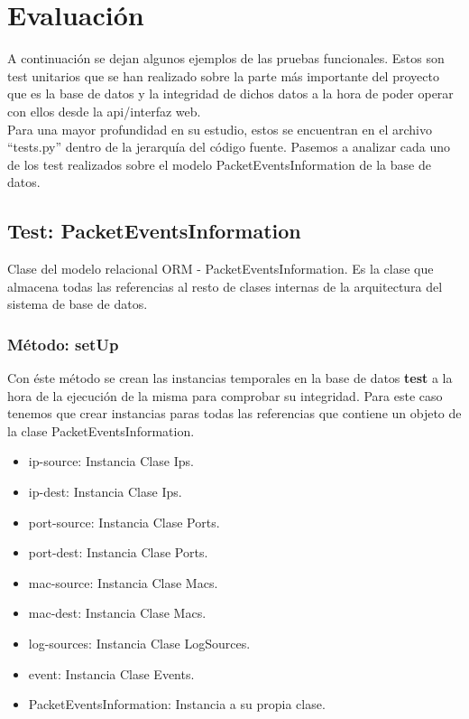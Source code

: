 \chapter{Evaluación}
\label{chap:evaluación}

A continuación se dejan algunos ejemplos de las pruebas funcionales. Estos son test unitarios que se han realizado sobre la parte más importante del proyecto que es la base de datos y la integridad de dichos datos a la hora de poder operar con ellos desde la api/interfaz web.\\

Para una mayor profundidad en su estudio, estos se encuentran en el archivo ``tests.py'' dentro de la jerarquía del código fuente. Pasemos a analizar cada uno de los test realizados sobre el modelo PacketEventsInformation de la base de datos.\\

\section{Test: PacketEventsInformation}

Clase del modelo relacional ORM - PacketEventsInformation. Es la clase que almacena todas las referencias al resto de clases internas de la arquitectura del sistema de base de datos.\\



\subsection{Método: setUp}
Con éste método se crean las instancias temporales en la base de datos \textbf{test} a la hora de la ejecución de la misma para comprobar su integridad. Para este caso tenemos que crear instancias paras todas las referencias que contiene un objeto de la clase PacketEventsInformation.



\begin{itemize}
\item ip-source: Instancia Clase Ips.
\item ip-dest: Instancia Clase Ips.
\item port-source: Instancia Clase Ports.
\item port-dest: Instancia Clase Ports.
\item mac-source: Instancia Clase Macs.
\item mac-dest: Instancia Clase Macs.
\item log-sources: Instancia Clase LogSources.
\item event: Instancia Clase Events.
\item PacketEventsInformation: Instancia a su propia clase.
\end{itemize}

